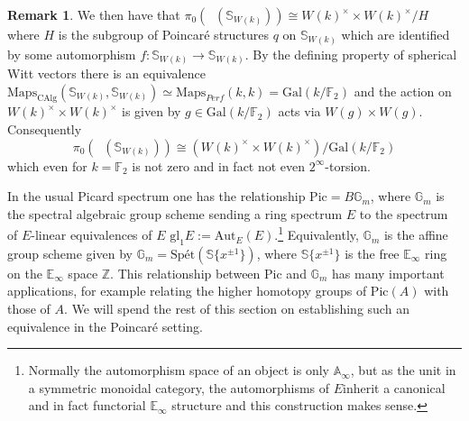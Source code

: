 \documentclass{article}
\DeclareMathOperator{\Picp}{Pic^p} %
\newcommand{\pic}{\ensuremath{\mathrm{Pic}}}
\theoremstyle{definition}
\newtheorem{remark}[equation]{Remark}
\begin{document}
\begin{remark}
We then have that $\pi_0(\Picp(\mathbb{S}_{W(k)}))\cong W(k)^\times \times W(k)^\times/H$ where $H$ is the subgroup of Poincar{\'e} structures $q$ on $\mathbb{S}_{W(k)}$ which are identified by some automorphism $f:\mathbb{S}_{W(k)}\to \mathbb{S}_{W(k)}$. By the defining property of spherical Witt vectors there is an equivalence $\mathrm{Maps}_{\mathrm{CAlg}}(\mathbb{S}_{W(k)}, \mathbb{S}_{W(k)})\simeq \mathrm{Maps}_{Perf}(k,k)=\mathrm{Gal}(k/\mathbb{F}_2)$ and the action on $W(k)^\times \times W(k)^\times$ is given by $g\in \mathrm{Gal}(k/\mathbb{F}_2)$ acts via $W(g)\times W(g)$. Consequently \[\pi_0(\Picp(\mathbb{S}_{W(k)}))\cong (W(k)^\times \times W(k)^\times) /\mathrm{Gal}(k/\mathbb{F}_2)\] which even for $k=\mathbb{F}_2$ is not zero and in fact not even $2^\infty$-torsion. 
\end{remark}

In the usual Picard spectrum one has the relationship $\pic = B\mathbb{G}_m$, where $\mathbb{G}_m$ is the spectral algebraic group scheme sending a ring spectrum $E$ to the spectrum of $E$-linear equivalences of $E$ $\mathrm{gl}_1E:=\mathrm{Aut}_E(E)$.\footnote{Normally the automorphism space of an object is only $\mathbb{A}_\infty$, but as the unit in a symmetric monoidal category, the automorphisms of $E$inherit a canonical and in fact functorial $\mathbb{E}_\infty$ structure and this construction makes sense.} 
Equivalently, $\mathbb{G}_m$ is the affine group scheme given by $\mathbb{G}_m=\mathrm{Sp}\textrm{\'et}(\mathbb{S}\{x^{\pm 1}\})$, where $\mathbb{S}\{x^{\pm 1}\}$ is the free $\mathbb{E}_\infty$ ring on the $\mathbb{E}_\infty$ space $\mathbb{Z}$. This relationship between $\pic$ and $\mathbb{G}_m$ has many important applications, for example relating the higher homotopy groups of $\pic(A)$ with those of $A$. 
We will spend the rest of this section on establishing such an equivalence in the Poincar\'e setting.
\end{document}
